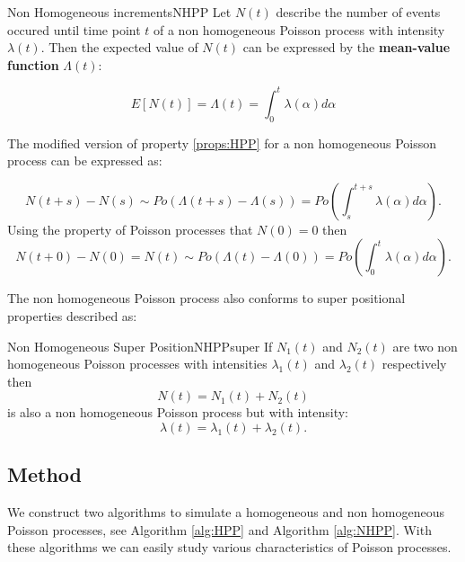 \begin{properties}{Non Homogeneous increments}{NHPP}
Let $N(t)$ describe the number of events occured until time point $t$ of a non homogeneous Poisson process with intensity $\lambda(t)$. Then the expected value of $N(t)$ can be expressed by the \textbf{mean-value function} $\Lambda(t)$:

\begin{equation}
    E[N(t)] = \Lambda(t) =\int_0^t\lambda(\alpha)d\alpha
\end{equation}
\label{eq:NHPPexp}

\noindent
The modified version of property \ref{props:HPP} for a non homogeneous Poisson process can be expressed as:

\begin{equation}
    N(t+s)-N(s)\sim \textit{Po}\left(\Lambda(t+s)-\Lambda(s)\right)=\textit{Po}(\int_{s}^{t+s}\lambda(\alpha)d\alpha).
\label{eq:NHPPinc}
\end{equation}
Using the property of Poisson processes that $N(0)=0$ then 
\begin{equation}
    N(t+0)-N(0)=N(t)\sim \textit{Po}\left(\Lambda(t)-\Lambda(0)\right)=\textit{Po}(\int_{0}^{t}\lambda(\alpha)d\alpha).
    \label{eq:NHPPdist}
\end{equation}
\end{properties}
The non homogeneous Poisson process also conforms to super positional properties described as:
\begin{property}{Non Homogeneous Super Position}{NHPPsuper}
If $N_1(t)$ and $N_2(t)$ are two non homogeneous Poisson processes with intensities $\lambda_1(t)$ and $\lambda_2(t)$ respectively then 
\begin{equation*}
    N(t)=N_1(t)+N_2(t)
\end{equation*}
is also a non homogeneous Poisson process but with intensity:
\begin{equation*}
    \lambda(t) = \lambda_1(t)+\lambda_2(t).
\end{equation*}
\end{property}

\newpage
\subsection{Method}
\label{sec:method3}
We construct two algorithms to simulate a homogeneous and non homogeneous Poisson processes, see Algorithm \ref{alg:HPP} and Algorithm \ref{alg:NHPP}. With these algorithms we can easily study various characteristics of Poisson processes. 
\\

